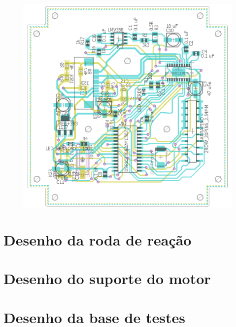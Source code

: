 \documentclass[
	12pt,				%
	openany,			%
	twoside,			%
	a4paper,			%
	english,			%
	french,				%
	spanish,			%
	brazil,				%
	oldfontcommands
	]{abntex2}
\begin{document}
\begin{apendicesenv}
\begin{figure}[th]
	\centering
	\includegraphics[width=1\linewidth]{./figs/Placa_motores}
\end{figure}

\label{ap:PMotor}

\chapter{Desenho da roda de reação}



\label{ap:RW}

\chapter{Desenho do suporte do motor}



\label{ap:MS}

\chapter{Desenho da base de testes}

%
%
%
%

\label{ap:TB}

\end{apendicesenv}
\end{document}
